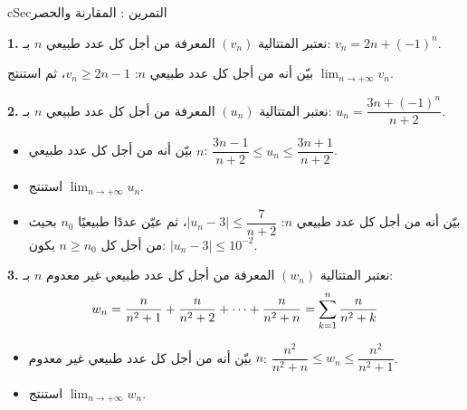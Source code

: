 \documentclass[12pt,a4paper]{article}
\newenvironment{BOX}[2]{\begin{otherlanguage}{english}\begin{arbox}{#1}{#2}}{\end{arbox}\end{otherlanguage}}
\newcounter{exo}
\newenvironment{tamrin}[1]{\stepcounter{exo}\begin{BOX}{cSec}{التمرين \theexo: #1}}{\end{BOX}}
\renewcommand{\cdots}{\mathinner{\cdotp\cdotp\cdotp}}
\newcommand{\limn}{\displaystyle\lim_{n\to+\infty}}
\newenvironment{sq}{\begin{itemize}[leftmargin=2.4em,itemsep=3pt]}{\end{itemize}}
\newcommand{\qa}{\item[(أ)]}\newcommand{\qb}{\item[(ب)]}\newcommand{\qc}{\item[(جـ)]}\newcommand{\qd}{\item[(د)]}\newcommand{\qe}{\item[(هـ)]}
\newcommand{\QQ}[1]{\par\smallskip\textbf{#1.} }
\begin{document}
\begin{tamrin}{المقارنة والحصر}
\QQ{1} نعتبر المتتالية $(v_n)$ المعرفة من أجل كل عدد طبيعي $n$ بـ: $v_n=2n+(-1)^n$.

بيّن أنه من أجل كل عدد طبيعي $n$: $v_n\geqslant 2n-1$، ثم استنتج $\limn v_n$.
\QQ{2} نعتبر المتتالية $(u_n)$ المعرفة من أجل كل عدد طبيعي $n$ بـ: $u_n=\dfrac{3n+(-1)^n}{n+2}$.
\begin{sq}
\qa بيّن أنه من أجل كل عدد طبيعي $n$: $\dfrac{3n-1}{n+2}\leqslant u_n\leqslant\dfrac{3n+1}{n+2}$.
\qb استنتج $\limn u_n$.
\qc بيّن أنه من أجل كل عدد طبيعي $n$: $\left|u_n-3\right|\leqslant\dfrac{7}{n+2}$، ثم عيّن عددًا طبيعيًا $n_0$ بحيث من أجل كل $n\geqslant n_0$ يكون: $\left|u_n-3\right|\leqslant10^{-2}$.
\end{sq}
\QQ{3} نعتبر المتتالية $(w_n)$ المعرفة من أجل كل عدد طبيعي غير معدوم $n$ بـ:
\[w_n=\frac{n}{n^2+1}+\frac{n}{n^2+2}+\cdots+\frac{n}{n^2+n}=\sum_{k=1}^{n}\frac{n}{n^2+k}\]
\begin{sq}
\qa بيّن أنه من أجل كل عدد طبيعي غير معدوم $n$: $\dfrac{n^2}{n^2+n}\leqslant w_n\leqslant\dfrac{n^2}{n^2+1}$.
\qb استنتج $\limn w_n$.
\end{sq}
\end{tamrin}
\end{document}
